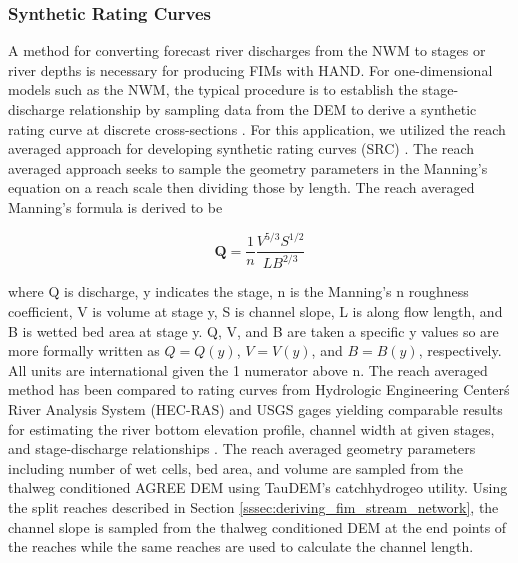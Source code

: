 \subsubsection{Synthetic Rating Curves}
\label{sssec:synthetic_rating_curve}
%
 A method for converting forecast river discharges from the NWM to stages or river depths is necessary for producing FIMs with HAND. 
For one-dimensional models such as the NWM, the typical procedure is to establish the stage-discharge relationship by sampling data from the DEM to derive a synthetic rating curve at discrete cross-sections \cite{quintero2021development,di2011hydraulic}. 
For this application, we utilized the reach averaged approach for developing synthetic rating curves (SRC) \cite{zheng2018river}.
The reach averaged approach seeks to sample the geometry parameters in the Manning's equation \cite{gauckler1867etudes,manning1890flow} on a reach scale then dividing those by length. 
The reach averaged Manning's formula is derived to be 
%
\begin{linenomath*}
\begin{equation}
\label{eq:reach_averaged_mannings_equation}
\textbf{Q} = \frac{1}{n} \frac{V^{5/3}S^{1/2}}{L B^{2/3}} 
\end{equation}
\end{linenomath*}
%
where Q is discharge, y indicates the stage, n is the Manning's n roughness coefficient, V is volume at stage y, S is channel slope, L is along flow length, and B is wetted bed area at stage y.
Q, V, and B are taken a specific y values so are more formally written as $Q = Q(y)$, $V = V(y)$, and $B = B(y)$, respectively.
All units are international given the 1 numerator above n.
The reach averaged method has been compared to rating curves from Hydrologic Engineering Center\'s River Analysis System (HEC-RAS) and USGS gages yielding comparable results for estimating the river bottom elevation profile, channel width at given stages, and stage-discharge relationships \cite{zheng2018river}.
The reach averaged geometry parameters including number of wet cells, bed area, and volume are sampled from the thalweg conditioned AGREE DEM using TauDEM's catchhydrogeo utility.
Using the split reaches described in Section \ref{sssec:deriving_fim_stream_network}, the channel slope is sampled from the thalweg conditioned DEM at the end points of the reaches while the same reaches are used to calculate the channel length.


